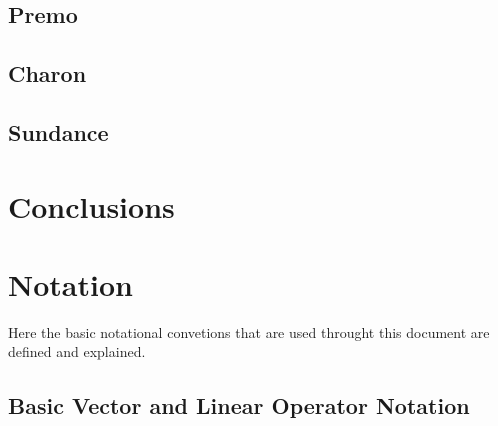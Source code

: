 \documentclass[pdf,ps2pdf,11pt]{SANDreport}
\begin{document}
\subsection{Premo}

\subsection{Charon}

\subsection{Sundance}

\section{Conclusions}

%
\clearpage



%
\appendix

\section{Notation}

Here the basic notational convetions that are used throught this
document are defined and explained.

\subsection{Basic Vector and Linear Operator Notation}
\end{document}
